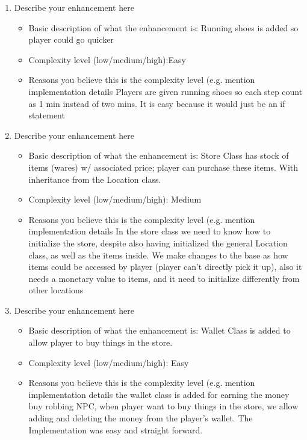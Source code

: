 \documentclass[11pt]{article}
\begin{document}
\begin{enumerate}
 \item Describe your enhancement here
	\begin{itemize}
	\item Basic description of what the enhancement is:
       \newline Running shoes is added so player could go quicker
	\item Complexity level (low/medium/high):\newline Easy
	\item Reasons you believe this is the complexity level (e.g. mention implementation details 
 \newline Players are given running shoes so each step count as 1 min instead of two mins. It is easy because it would just be an if statement
	\end{itemize}
 
\item Describe your enhancement here
	\begin{itemize}
	\item Basic description of what the enhancement is: \newline Store Class has stock of items (wares) w/ associated price; player can purchase these items. With inheritance from the Location class. 
	\item Complexity level (low/medium/high): \newline Medium
	\item Reasons you believe this is the complexity level (e.g. mention implementation details 
 \newline In the store class we need to know how to initialize the store, despite also having initialized the general Location class, as well as the items inside. We make changes to the base as how items could be accessed by player (player can’t directly pick it up), also it needs a monetary value to items, and it need to initialize differently from other locations


	\end{itemize}

\item Describe your enhancement here
	\begin{itemize}
	\item Basic description of what the enhancement is: \newline Wallet Class is added to allow player to buy things in the store. 
	\item Complexity level (low/medium/high): \newline Easy
	\item Reasons you believe this is the complexity level (e.g. mention implementation details 
 \newline the wallet class is added for earning the money buy robbing NPC, when player want to buy things in the store, we allow adding and deleting the money from the player's wallet. The Implementation was easy and straight forward. 
	\end{itemize}
 

\end{enumerate}
\end{document}
